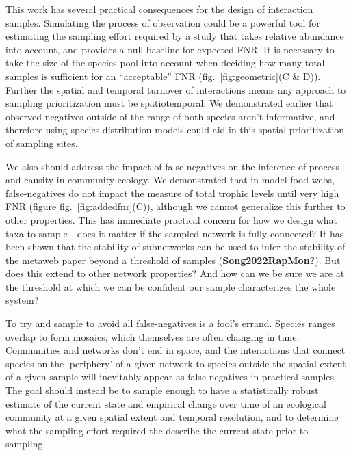 \documentclass[11pt]{article}
\begin{document}
This work has several practical consequences for the design of
interaction samples. Simulating the process of observation could be a
powerful tool for estimating the sampling effort required by a study
that takes relative abundance into account, and provides a null baseline
for expected FNR. It is necessary to take the size of the species pool
into account when deciding how many total samples is sufficient for an
``acceptable'' FNR (fig.~\ref{fig:geometric}(C \& D)). Further the
spatial and temporal turnover of interactions means any approach to
sampling prioritization must be spatiotemporal. We demonstrated earlier
that observed negatives outside of the range of both species aren't
informative, and therefore using species distribution models could aid
in this spatial prioritization of sampling sites.

We also should address the impact of false-negatives on the inference of
process and causity in community ecology. We demonstrated that in model
food webs, false-negatives do not impact the measure of total trophic
levels until very high FNR (figure fig.~\ref{fig:addedfnr}(C)), although
we cannot generalize this further to other properties. This has
immediate practical concern for how we design what taxa to sample---does
it matter if the sampled network is fully connected? It has been shown
that the stability of subnetworks can be used to infer the stability of
the metaweb paper beyond a threshold of samples
(\textbf{Song2022RapMon?}). But does this extend to other network
properties? And how can we be sure we are at the threshold at which we
can be confident our sample characterizes the whole system?

To try and sample to avoid all false-negatives is a fool's errand.
Species ranges overlap to form mosaics, which themselves are often
changing in time. Communities and networks don't end in space, and the
interactions that connect species on the `periphery' of a given network
to species outside the spatial extent of a given sample will inevitably
appear as false-negatives in practical samples. The goal should instead
be to sample enough to have a statistically robust estimate of the
current state and empirical change over time of an ecological community
at a given spatial extent and temporal resolution, and to determine what
the sampling effort required the describe the current state prior to
sampling.
\end{document}

